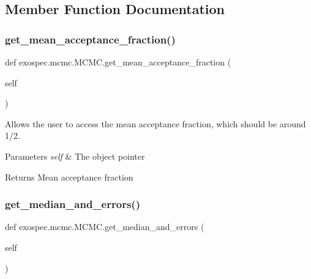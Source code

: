 \subsection{Member Function Documentation}
\mbox{\label{classexospec_1_1mcmc_1_1_m_c_m_c_afec10cdfb36657e6e1c013bbd563bd71}} 
\subsubsection{\texorpdfstring{get\+\_\+mean\+\_\+acceptance\+\_\+fraction()}{get\_mean\_acceptance\_fraction()}}
{\footnotesize\ttfamily def exospec.\+mcmc.\+M\+C\+M\+C.\+get\+\_\+mean\+\_\+acceptance\+\_\+fraction (\begin{DoxyParamCaption}\item[{}]{self }\end{DoxyParamCaption})}



Allows the user to access the mean acceptance fraction, which should be around 1/2. 


\begin{DoxyParams}{Parameters}
{\em self} & The object pointer \\
\hline
\end{DoxyParams}
\begin{DoxyReturn}{Returns}
Mean acceptance fraction 
\end{DoxyReturn}
\mbox{\label{classexospec_1_1mcmc_1_1_m_c_m_c_a7fe8d9326590fe7cc875fa5118eaa617}} 
\subsubsection{\texorpdfstring{get\+\_\+median\+\_\+and\+\_\+errors()}{get\_median\_and\_errors()}}
{\footnotesize\ttfamily def exospec.\+mcmc.\+M\+C\+M\+C.\+get\+\_\+median\+\_\+and\+\_\+errors (\begin{DoxyParamCaption}\item[{}]{self }\end{DoxyParamCaption})}



